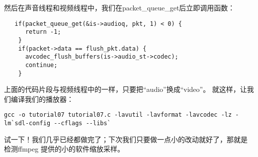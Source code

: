 然后在声音线程和视频线程中，我们在packet_queue_get后立即调用函数：

\begin{lstlisting}
   if(packet_queue_get(&is->audioq, pkt, 1) < 0) {
      return -1;
    }
    if(packet->data == flush_pkt.data) {
      avcodec_flush_buffers(is->audio_st->codec);
      continue;
    }
\end{lstlisting}

上面的代码片段与视频线程中的一样，只要把“audio”换成“video”。
就这样，让我们编译我们的播放器：

\begin{lstlisting}
gcc -o tutorial07 tutorial07.c -lavutil -lavformat -lavcodec -lz -lm`sdl-config --cflags --libs`
\end{lstlisting}

试一下！我们几乎已经都做完了；下次我们只要做一点小的改动就好了，那就是
检测ffmpeg 提供的小的软件缩放采样。

